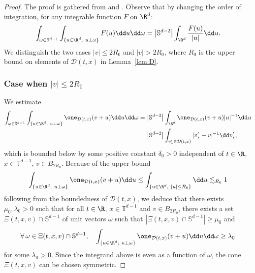 \begin{proof}
The proof is gathered from \cite[Lem.\,4.8]{luis} and
\cite[Lem.\,7.1]{luis}. Observe that by changing the order of
integration, for any integrable function $F$ on $\R^d$:
\[
\int_{\omega \in \mathbb{S}^{d-1}} \int_{\{u \in \R^d, \ u \bot
\omega\}} F(u) \dd u \dd \omega = \left| \mathbb{S}^{d-2}\right|
\int_{\R^d} \frac{F(u)}{|u|} \dd u.
\]
We distinguish the two cases $|v| \le 2 R_0$ and $|v| > 2 R_0$,
where $R_0$ is the upper bound on elements of $\mathcal{D}(t,x)$ in
Lemma~\ref{lem:D}.

\subsubsection*{Case when $|v| \le 2 R_0$}
We estimate
\begin{align*}
\int_{\omega \in \mathbb{S}^{d-1}} \int_{\{ u \in \R^{d}, \ u \bot \omega \}}
\one_{\mathcal{D}(t,x)}(v+u) \dd u \dd \omega
& = \left| \mathbb{S}^{d-2}
\right| \int_{\R^d} \one_{\mathcal{D}(t,x)}(v+u) |u|^{-1} \dd u \\
& = \left| \mathbb{S}^{d-2}
\right| \int_{v'_* \in \mathcal{D}(t,x)} |v'_*-v|^{-1} \dd v'_*,
\end{align*}
which is bounded below by some positive constant $\delta_0>0$
independent of $t \in \R$, $x \in \mathbb{T}^{d-1}$,
$v \in B_{2R_0}$. Because of the upper bound
\begin{equation}\label{eq:upper-cone}
\int_{\{ u \in \R^{d}, \ u \bot \omega \}}
\one_{\mathcal{D}(t,x)}(v+u) \dd u \le
\int_{\{ u \in \R^{d}, \ |u| \le R_0 \}}
\dd u \lesssim_{R_0} 1
\end{equation}
following from the boundedness of $\mathcal{D}(t,x)$, we deduce that
there exists $\mu_0,\lambda_0>0$ such that for all $t \in \R$,
$x \in \mathbb{T}^{d-1}$ and $v \in B_{2R_0}$, there exists a set
$\Xi(t,x,v) \cap \mathbb{S}^{d-1}$ of unit vectors $\omega$ such
that $| \Xi(t,x,v) \cap \mathbb{S}^{d-1} | \ge \mu_0$ and
\[
\forall \, \omega \in \Xi(t,x,v) \cap \mathbb{S}^{d-1}, \quad
\int_{\{ u \in \R^{d}, \ u \bot \omega \}}
\one_{\mathcal{D}(t,x)}(v+u) \dd u \dd \omega \ge \lambda_0
\]
for some $\lambda_0>0$. Since the integrand above is even as a
function of $\omega$, the cone $\Xi(t,x,v)$ can be chosen symmetric.


\end{proof}

